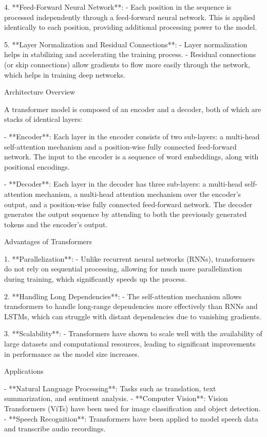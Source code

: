 4. **Feed-Forward Neural Network**:
   - Each position in the sequence is processed independently through a feed-forward neural network. This is applied identically to each position, providing additional processing power to the model.

5. **Layer Normalization and Residual Connections**:
   - Layer normalization helps in stabilizing and accelerating the training process.
   - Residual connections (or skip connections) allow gradients to flow more easily through the network, which helps in training deep networks.

 Architecture Overview

A transformer model is composed of an encoder and a decoder, both of which are stacks of identical layers:

- **Encoder**: Each layer in the encoder consists of two sub-layers: a multi-head self-attention mechanism and a position-wise fully connected feed-forward network. The input to the encoder is a sequence of word embeddings, along with positional encodings.
  
- **Decoder**: Each layer in the decoder has three sub-layers: a multi-head self-attention mechanism, a multi-head attention mechanism over the encoder's output, and a position-wise fully connected feed-forward network. The decoder generates the output sequence by attending to both the previously generated tokens and the encoder's output.

 Advantages of Transformers

1. **Parallelization**:
   - Unlike recurrent neural networks (RNNs), transformers do not rely on sequential processing, allowing for much more parallelization during training, which significantly speeds up the process.

2. **Handling Long Dependencies**:
   - The self-attention mechanism allows transformers to handle long-range dependencies more effectively than RNNs and LSTMs, which can struggle with distant dependencies due to vanishing gradients.

3. **Scalability**:
   - Transformers have shown to scale well with the availability of large datasets and computational resources, leading to significant improvements in performance as the model size increases.

 Applications

- **Natural Language Processing**: Tasks such as translation, text summarization, and sentiment analysis.
- **Computer Vision**: Vision Transformers (ViTs) have been used for image classification and object detection.
- **Speech Recognition**: Transformers have been applied to model speech data and transcribe audio recordings.

